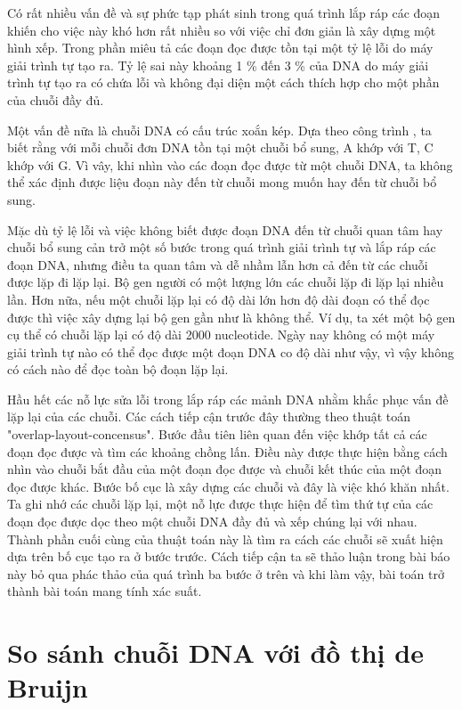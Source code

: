 \documentclass[14pt, a4paper]{article}
\numberwithin{equation}{section}
\numberwithin{figure}{section}
\numberwithin{dl}{section}
\numberwithin{md}{section}
\numberwithin{bd}{section}
\numberwithin{dn}{section}
\numberwithin{hq}{section}
\begin{document}
    Có rất nhiều vấn đề và sự phức tạp phát sinh trong quá trình lắp ráp các đoạn khiến cho việc này khó hơn rất nhiều so với việc chỉ đơn giản là xây dựng một hình xếp.
    Trong phần miêu tả các đoạn đọc được tồn tại một tỷ lệ lỗi do máy giải trình tự tạo ra.
    Tỷ lệ sai này khoảng 1 \% đến 3 \% của DNA do máy giải trình tự tạo ra có chứa lỗi và không đại diện một cách thích hợp cho một phần của chuỗi đầy đủ.

    Một vấn đề nữa là chuỗi DNA có cấu trúc xoắn kép.
    Dựa theo công trình \cite{watson2003molecular}, ta biết rằng với mỗi chuỗi đơn DNA tồn tại một chuỗi bổ sung, A khớp với T, C khớp với G.
    Vì vây, khi nhìn vào các đoạn đọc được từ một chuỗi DNA, ta không thể xác định được liệu đoạn này đến từ chuỗi mong muốn hay đến từ chuỗi bổ sung.

    Mặc dù tỷ lệ lỗi và việc không biết được đoạn DNA đến từ chuỗi quan tâm hay chuỗi bổ sung cản trở một số bước trong quá trình giải trình tự và lắp ráp các đoạn DNA, nhưng điều ta quan tâm và dễ nhầm lẫn hơn cả đến từ các chuỗi được lặp đi lặp lại.
    Bộ gen người có một lượng lớn các chuỗi lặp đi lặp lại nhiều lần.
    Hơn nữa, nếu một chuỗi lặp lại có độ dài lớn hơn độ dài đoạn có thể đọc được thì việc xây dựng lại bộ gen gần như là không thể.
    Ví dụ, ta xét một bộ gen cụ thể có chuỗi lặp lại có độ dài 2000 nucleotide.
    Ngày nay không có một máy giải trình tự nào có thể đọc được một đoạn DNA co độ dài như vậy, vì vậy không có cách nào để đọc toàn bộ đoạn lặp lại.

    Hầu hết các nỗ lực sửa lỗi trong lắp ráp các mảnh DNA nhằm khắc phục vấn đề lặp lại của các chuỗi.
    Các cách tiếp cận trước đây thường theo thuật toán "overlap-layout-concensus".
    Bước đầu tiên liên quan đến việc khớp tất cả các đoạn đọc được và tìm các khoảng chồng lấn.
    Điều này được thực hiện bằng cách nhìn vào chuỗi bắt đầu của một đoạn đọc được và chuỗi kết thúc của một đoạn đọc được khác.
    Bước bố cục là xây dựng các chuỗi và đây là việc khó khăn nhất.
    Ta ghi nhớ các chuỗi lặp lại, một nỗ lực được thực hiện để tìm thứ tự của các đoạn đọc được dọc theo một chuỗi DNA đầy đủ và xếp chúng lại với nhau.
    Thành phần cuối cùng của thuật toán này là tìm ra cách các chuỗi sẽ xuất hiện dựa trên bố cục tạo ra ở bước trước.
    Cách tiếp cận ta sẽ thảo luận trong bài báo này bỏ qua phác thảo của quá trình ba bước ở trên và khi làm vậy, bài toán trở thành bài toán mang tính xác suất.
    
    \section{So sánh chuỗi DNA với đồ thị de Bruijn}
\end{document}
